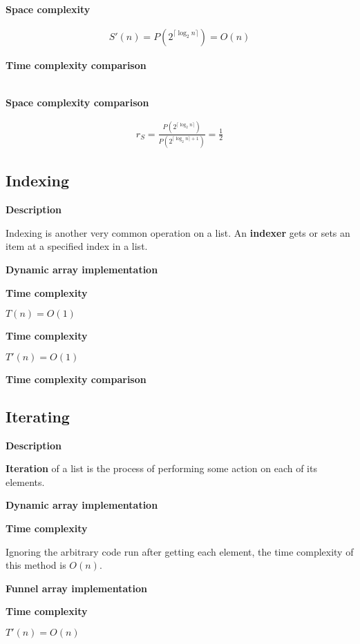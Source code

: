 \documentclass{article}
\newcommand{\descriptn}{\textbf{Description}}
\newcommand{\dynarrayimpl}{\textbf{Dynamic array implementation}}
\newcommand{\funarrayimpl}{\textbf{Funnel array implementation}}
\newcommand{\tcomplex}{\textbf{Time complexity}}
\newcommand{\scomplex}{\textbf{Space complexity}}
\newcommand{\tcomplexcmp}{\textbf{Time complexity comparison}}
\newcommand{\scomplexcmp}{\textbf{Space complexity comparison}}
\newcommand{\timefn}{T}
\newcommand{\spacefn}{S}
\newcommand{\timenewfn}{\timefn'}
\newcommand{\spacenewfn}{\spacefn'}
\newcommand{\spaceratio}{r_\spacefn}
\newcommand{\bigo}{O}
\newcommand{\biggo}{P}
\newcommand{\varnitems}{n}
\begin{document}
	\scomplex
	
	\begin{align*}
	\spacenewfn(\varnitems) = \biggo(2^{\lceil \log_2 \varnitems \rceil}) = \bigo(\varnitems)
	\end{align*}
	
	\tcomplexcmp
	
	\begin{align*}
	\end{align*}
	
	\scomplexcmp
	
	\begin{align*}
	\spaceratio = \frac {\biggo(2^{\lceil \log_2 \varnitems \rceil})} {\biggo(2^{\lceil \log_2 \varnitems \rceil + 1})} = \frac{1}{2}
	\end{align*}
	
	\subsection{Indexing}
	
	\descriptn
	
	Indexing is another very common operation on a list. An \textbf{indexer} gets or sets an item at a specified index in a list.
	
	\dynarrayimpl
	
	\tcomplex
	
	$\timefn(\varnitems) = \bigo(1)$
	
	
	\tcomplex
	
	$\timenewfn(\varnitems) = \bigo(1)$
	
	\tcomplexcmp
	
	\subsection{Iterating}
	
	\descriptn
	
	\textbf{Iteration} of a list is the process of performing some action on each of its elements.
	
	\dynarrayimpl
	
	\tcomplex
	
	Ignoring the arbitrary code run after getting each element, the time complexity of this method is $\bigo(\varnitems)$.
	
	\funarrayimpl
	
	\tcomplex
	
	$\timenewfn(\varnitems) = \bigo(\varnitems)$
	
\end{document}

